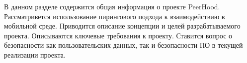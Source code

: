 В данном разделе содержится общая информация о проекте PeerHood.
Рассматривется использование пирингового подхода к взаимодействию в мобильной среде.
Приводится описание концепции и целей разрабатываемого проекта.
Описываются ключевые требования к проекту.
Ставится вопрос о безопасности как пользовательских данных, так и безопасности ПО в текущей 
реализации проекта.